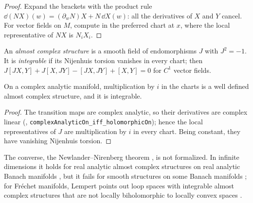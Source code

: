 \begin{proof}
  \leanok
  Expand the brackets with the product rule $\dd(NX)(w) = (\partial_w N) X + N\,\dd X(w)$: all
  the derivatives of $X$ and $Y$ cancel. For vector fields on $M$, compute in the preferred chart
  at $x$, where the local representative of $NX$ is $N_i X_i$.
\end{proof}

\begin{definition}
  \label{def:almost-complex}
  \leanok
  An \emph{almost complex structure} is a smooth field of endomorphisms $J$ with $J^2 = -1$. It
  is \emph{integrable} if its Nijenhuis torsion vanishes in every chart; then
  $J[JX, Y] + J[X, JY] - [JX, JY] + [X, Y] = 0$ for $C^1$ vector fields.
\end{definition}

\begin{theorem}
  \label{thm:canonical-J}
  \leanok
  On a complex analytic manifold, multiplication by $i$ in the charts is a well defined almost
  complex structure, and it is integrable.
\end{theorem}

\begin{proof}
  \leanok
  The transition maps are complex analytic, so their derivatives are complex linear
  (\cite{LCA}, \texttt{complexAnalyticOn\_iff\_holomorphicOn}); hence the local representatives
  of $J$ are multiplication by $i$ in every chart. Being constant, they have vanishing Nijenhuis
  torsion.
\end{proof}

The converse, the Newlander--Nirenberg theorem \cite{NN57}, is not formalized. In infinite dimensions it holds
for real analytic almost complex structures on real analytic Banach manifolds
\cite[Theorem 7, p.~64]{Bel05}, but it fails for smooth structures on some Banach manifolds
\cite[Theorem 3.1, p.~401]{Pat99}; for Fréchet manifolds, Lempert points out loop spaces with integrable
almost complex structures that are not locally biholomorphic to locally convex spaces
\cite[\S2, pp.~489--490]{Lem98}.


